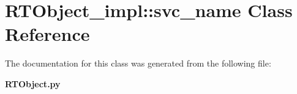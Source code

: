 \section{RTObject\_\-impl::svc\_\-name Class Reference}
\label{classRTObject__impl_1_1svc__name}


The documentation for this class was generated from the following file:\begin{CompactItemize}
\item 
{\bf RTObject.py}\end{CompactItemize}
